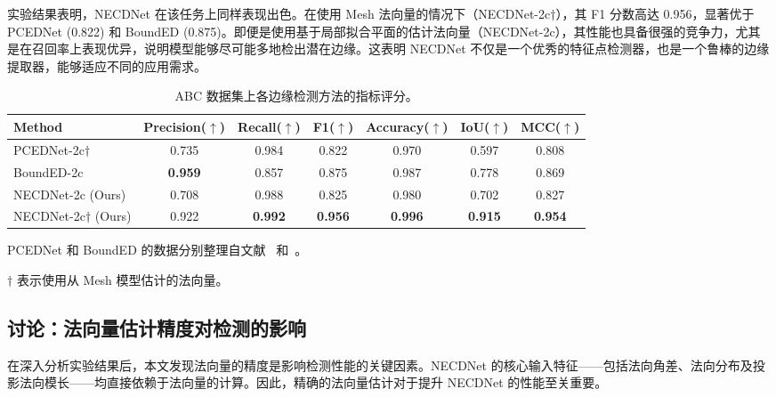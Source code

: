 实验结果表明，NECDNet 在该任务上同样表现出色。在使用 Mesh 法向量的情况下（NECDNet-2c$\dagger$），其 F1 分数高达 0.956，显著优于 PCEDNet (0.822) 和 BoundED (0.875)。即便是使用基于局部拟合平面的估计法向量（NECDNet-2c），其性能也具备很强的竞争力，尤其是在召回率上表现优异，说明模型能够尽可能多地检出潜在边缘。这表明 NECDNet 不仅是一个优秀的特征点检测器，也是一个鲁棒的边缘提取器，能够适应不同的应用需求。

\begin{table}[ht]
    \centering
    \small
    \begin{threeparttable}
    \setlength{\tabcolsep}{7pt}
    \caption{ABC 数据集上各边缘检测方法的指标评分。}
    \label{tab:edge_result}
    \begin{tabular}{lcccccc}
        \toprule
        Method & Precision($\uparrow$) & Recall($\uparrow$) & F1($\uparrow$) & Accuracy($\uparrow$) & IoU($\uparrow$) & MCC($\uparrow$) \\
        \midrule
        PCEDNet-2c$\dagger$~\cite{himeur_pcednet_2022} & 0.735 & 0.984 & 0.822 & 0.970 & 0.597 & 0.808 \\
        BoundED-2c~\cite{bode_bounded_2023} & \textbf{0.959} & 0.857 & 0.875 & 0.987 & 0.778 & 0.869 \\
        NECDNet-2c (Ours) & 0.708 & 0.988 & 0.825 & 0.980 & 0.702 & 0.827 \\
        NECDNet-2c$\dagger$ (Ours) & 0.922 & \textbf{0.992} & \textbf{0.956} & \textbf{0.996} & \textbf{0.915} & \textbf{0.954} \\
        \bottomrule
    \end{tabular}
    \begin{tablenotes}
        \footnotesize
         \item PCEDNet 和 BoundED 的数据分别整理自文献~\cite{himeur_pcednet_2022} 和~\cite{bode_bounded_2023}。
        
        \item $\dagger$ 表示使用从 Mesh 模型估计的法向量。 
     \end{tablenotes}
     \end{threeparttable}
    
\end{table}

\subsection{讨论：法向量估计精度对检测的影响}

在深入分析实验结果后，本文发现法向量的精度是影响检测性能的关键因素。NECDNet 的核心输入特征——包括法向角差、法向分布及投影法向模长——均直接依赖于法向量的计算。因此，精确的法向量估计对于提升 NECDNet 的性能至关重要。

